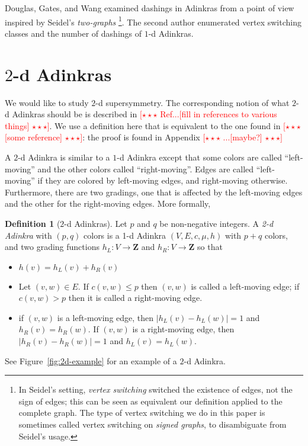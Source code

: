 \documentclass[12pt,twoside,singlespace]{article}
\numberwithin{equation}{section}
\theoremstyle{definition}
\newtheorem{definition}[equation]{Definition}
\newcommand{\ZZ}{\mathbf{Z}}
\newcommand{\com}[1]{\textcolor{red}{$[\star \star \star$ #1 $\star \star \star]$}}
\begin{document}
Douglas, Gates, and Wang \cite{douglas} examined dashings in Adinkras from a point of view inspired by Seidel's \emph{two-graphs} \cite{seidel:survey} \footnote{In Seidel's setting, \emph{vertex switching} switched the existence of edges, not the sign of edges; this can be seen as equivalent our definition applied to the complete graph. The type of vertex switching we do in this paper is sometimes called vertex switching on \emph{signed graphs}, to disambiguate from Seidel's usage.}. The second author \cite{zhang:adinkras} enumerated vertex switching classes and the number of dashings of $1$-d Adinkras.

\section{$2$-d Adinkras}
We would like to study $2$-d supersymmetry. The corresponding notion of what $2$-d Adinkras should be is described in \com{Ref...[fill in references to various things]}.  We use a definition here that is equivalent to the one found in \com{[some reference]}: the proof is found in Appendix \com{...[maybe?]}

A $2$-d Adinkra is similar to a $1$-d Adinkra except that some colors are called ``left-moving'' and the other colors called ``right-moving''.  Edges are called ``left-moving'' if they are colored by left-moving edges, and right-moving otherwise.  Furthermore, there are two gradings, one that is affected by the left-moving edges and the other for the right-moving edges. More formally,
\begin{definition}[$2$-d Adinkras]
Let $p$ and $q$ be non-negative integers. A \emph{2-d Adinkra} with $(p,q)$ colors is a 1-d Adinkra $(V,E,c,\mu,h)$ with $p+q$ colors, and two grading functions $h_L:V\to \ZZ$ and $h_R:V\to \ZZ$ so that
\begin{itemize}
\item $h(v)=h_L(v)+h_R(v)$
\item Let $(v,w)\in E$.  If $c(v,w)\le p$ then $(v,w)$ is called a left-moving edge; if $c(v,w)>p$ then it is called a right-moving edge.
\item if $(v,w)$ is a left-moving edge, then $|h_L(v)-h_L(w)|=1$ and $h_R(v)=h_R(w)$.  If $(v,w)$ is a right-moving edge, then $|h_R(v)-h_R(w)|=1$ and $h_L(v)=h_L(w)$.
\end{itemize}

See Figure~\ref{fig:2d-example} for an example of a $2$-d Adinkra.
\end{definition}
\end{document}
